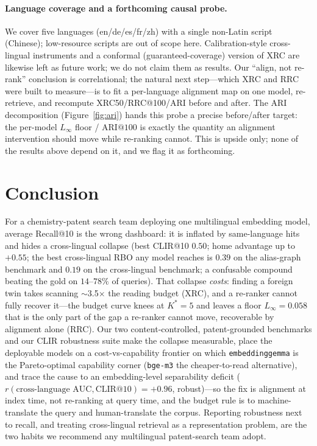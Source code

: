 \documentclass[11pt]{article}
\begin{document}
\paragraph{Language coverage and a forthcoming causal probe.}
We cover five languages (en/de/es/fr/zh) with a single non-Latin script
(Chinese); low-resource scripts are out of scope here. Calibration-style
cross-lingual instruments and a conformal (guaranteed-coverage) version of XRC
are likewise left as future work; we do not claim them as results. Our
``align, not re-rank'' conclusion is correlational; the natural next step---which
XRC and RRC were built to measure---is to fit a per-language alignment map on one
model, re-retrieve, and recompute XRC50/RRC@100/ARI before and after. The ARI
decomposition (Figure~\ref{fig:ari}) hands this probe a precise before/after
target: the per-model $L_\infty$ floor / $\mathrm{ARI@}100$ is exactly the
quantity an alignment intervention should move while re-ranking cannot. This is
upside only; none of the results above depend on it, and we flag it as
forthcoming.

\section{Conclusion}

For a chemistry-patent search team deploying one multilingual embedding model,
average Recall@10 is the wrong dashboard: it is inflated by same-language hits
and hides a cross-lingual collapse (best CLIR@10 $0.50$; home advantage up to
$+0.55$; the best cross-lingual RBO any model reaches is $0.39$ on the
alias-graph benchmark and $0.19$ on the cross-lingual benchmark; a confusable
compound beating the gold on $14$--$78\%$ of queries). That collapse \emph{costs}:
finding a foreign twin takes scanning $\sim$3.5$\times$ the reading budget (XRC),
and a re-ranker cannot fully recover it---the budget curve knees at $K^{\!*}{=}5$
and leaves a floor $L_\infty=0.058$ that is the only part of the gap a re-ranker
cannot move, recoverable by alignment alone (RRC). Our two
content-controlled, patent-grounded benchmarks and our CLIR robustness suite make
the collapse measurable, place the deployable models on a cost-vs-capability
frontier on which \texttt{embeddinggemma} is the Pareto-optimal capability corner
(\texttt{bge-m3} the cheaper-to-read alternative), and trace the cause to an
embedding-level separability deficit
($r(\text{cross-language AUC},\text{CLIR@10})=+0.96$, robust)---so the fix is
alignment at index time, not re-ranking at query time, and the budget rule is to
machine-translate the query and human-translate the corpus. Reporting robustness
next to recall, and treating cross-lingual retrieval as a representation problem,
are the two habits we recommend any multilingual patent-search team adopt.
\end{document}
